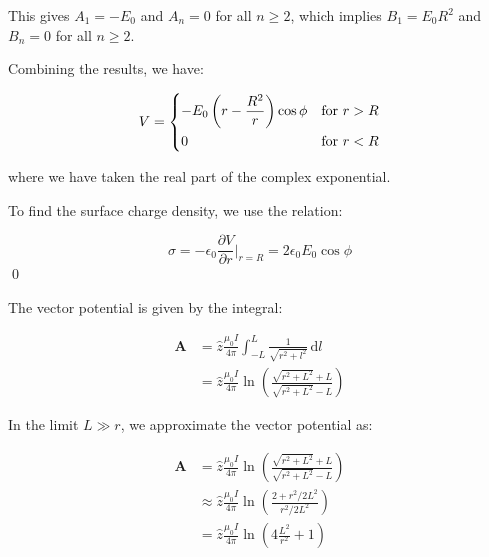 \documentclass[12pt]{article}
\begin{document}


This gives $A_{1} = -E_{0}$ and $A_{n} = 0$ for all $n \ge 2$, which implies $B_{1} = E_{0} R^{2}$ and $B_{n} = 0$ for all $n \ge 2$.

Combining the results, we have:

\begin{equation}
    V =
    \begin{dcases}
        -E_{0} \left( r - \frac{R^{2}}{r} \right) \cos{\phi} & \text{for } r > R \\
        0                                                    & \text{for } r < R
    \end{dcases}
\end{equation}

where we have taken the real part of the complex exponential.

To find the surface charge density, we use the relation:

\begin{equation}
    \sigma = -\epsilon_{0} \frac{\partial V}{\partial r} \bigg\rvert_{r = R} = 2\epsilon_{0} E_{0} \cos{\phi}
\end{equation}
\qed



The vector potential is given by the integral:

\begin{equation}
    \begin{split}
        \mathbf{A} &= \hat{z} \frac{\mu_{0} I}{4\pi} \int_{-L}^{L} \frac{1}{\sqrt{r^{2} + {l^{2}}}} \, \mathrm{d}l \\
        &= \hat{z} \frac{\mu_{0} I}{4\pi} \ln{\left( \frac{\sqrt{r^{2} + L^{2}} + L}{\sqrt{r^{2} + L^{2}} - L} \right)}
    \end{split}
\end{equation}

In the limit $L \gg r$, we approximate the vector potential as:

\begin{equation}
    \begin{split}
        \mathbf{A} &= \hat{z} \frac{\mu_{0} I}{4\pi} \ln{\left( \frac{\sqrt{r^{2} + L^{2}} + L}{\sqrt{r^{2} + L^{2}} - L} \right)} \\
        &\approx \hat{z} \frac{\mu_{0} I}{4\pi} \ln{\left( \frac{2 + r^{2}/2L^{2}}{r^{2}/2L^{2}} \right)} \\
        &= \hat{z} \frac{\mu_{0} I}{4\pi} \ln{\left( 4\frac{L^{2}}{r^{2}} + 1 \right)}
    \end{split}
\end{equation}
\end{document}
